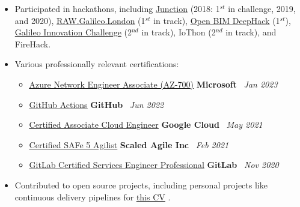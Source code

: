 \documentclass[11pt,a4paper,sans]{moderncv}
\newcommand{\inlineLink}[2]{%
    \underline{\href{#1}{#2}}%
}
\begin{document}
{

\begin{itemize}[label=\textbullet]
    \item Participated in hackathons, including 
        \href{https://www.hackjunction.com/}{Junction} (2018: 1$^{st}$ in challenge, 2019, and 2020), 
        \href{https://raw.galileo.london/}{RAW.Galileo.London} (1$^{st}$ in track), 
        \href{https://ultrahack.org/open-bim-deephack}{Open BIM DeepHack} (1$^{st}$), 
        \href{https://ultrahack.org/galileoinnovationchallenge}{Galileo Innovation Challenge} (2$^{nd}$ in track), 
        IoThon (2$^{nd}$ in track), and 
        FireHack.
    
    \item Various professionally relevant certifications:
        {
        \newcommand{\certificateEntry}[4]{%
            \item \inlineLink{#1}{#2} \hfill {\bfseries #3} \ {\itshape #4}%
        }

        \begin{itemize}
            \certificateEntry
            {https://www.credly.com/badges/f2b4e861-75b4-43cd-8cb5-98835bf5a2d3/public_url}
            {Azure Network Engineer Associate (AZ-700)}
            {Microsoft}
            {Jan 2023}
        
            \certificateEntry
            {https://www.credly.com/badges/4d91abb3-5f49-4f22-a0cc-d8d4f6841738/public_url}
            {GitHub Actions}
            {GitHub}
            {Jun 2022}
        
            \certificateEntry
            {https://www.credential.net/3e7c1e77-e591-40d3-88ff-67494b422cfc?key=9d07014f6e1465d00a525436cfdb53cc8b7fd70ae353b12ea668dee572d2c797}
            {Certified Associate Cloud Engineer}
            {Google Cloud}
            {May 2021}
        
            \certificateEntry
            {https://www.youracclaim.com/badges/deb40f91-a445-4e73-aed5-714988eefd80/}
            {Certified SAFe 5 Agilist}
            {Scaled Agile Inc}
            {Feb 2021}
        
            \certificateEntry
            {https://www.credly.com/badges/d9372b90-3057-4429-b61f-e8cd4c2b6615/public_url}
            {GitLab Certified Services Engineer Professional}
            {GitLab}
            {Nov 2020}
        \end{itemize}
        }
    \item Contributed to open source projects, including personal projects like continuous delivery pipelines for \inlineLink{https://github.com/addono/cv}{this CV}.
\end{itemize}} 
\end{document}
